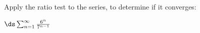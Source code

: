 Apply the ratio test to the series, to determine if it converges:

\medskip
$\ds \sum_{n=1}^\infty \frac{6^n}{7^{n-1}}$

